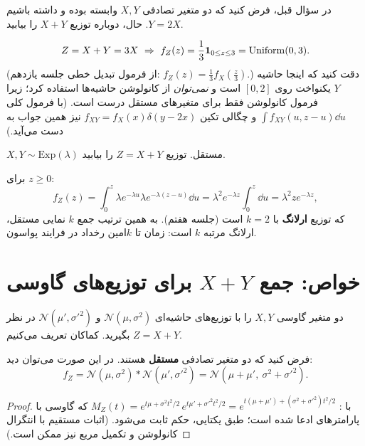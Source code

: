 \begin{example}
در سؤال قبل، فرض کنید که دو متغیر تصادفی $X,Y$ وابسته بوده و داشته باشیم $Y=2X$. حال، دوباره توزیع $X+Y$ را بیابید.
\begin{solution}
\[
Z=X+Y=3X\ \Rightarrow\ f_Z(z)=\frac13\ind_{0\le z\le3}=\mathrm{Uniform}(0,3).
\]
(از فرمول تبدیل خطی جلسه یازدهم: $f_Z(z)=\frac13f_X(\frac z3)$.) دقت کنید که اینجا حاشیه $Y$ یکنواخت روی $[0,2]$ است و \emph{نمی‌توان} از کانولوشن حاشیه‌ها استفاده کرد؛ زیرا فرمول کانولوشن فقط برای متغیرهای مستقل درست است. (با فرمول کلی $\int f_{XY}(u,z-u)\dd u$ و چگالی تکین $f_{XY}=f_X(x)\delta(y-2x)$ نیز همین جواب به دست می‌آید.)
\end{solution}
\end{example}

\begin{example}
$X,Y\sim\mathrm{Exp}(\lambda)$ مستقل. توزیع $Z=X+Y$ را بیابید.
\begin{solution}
برای $z\ge0$:
\[
f_Z(z)=\int_0^z\lambda e^{-\lambda u}\lambda e^{-\lambda(z-u)}\dd u=\lambda^2e^{-\lambda z}\int_0^z\dd u=\lambda^2ze^{-\lambda z},
\]
که توزیع \textbf{ارلانگ} با $k=2$ است (جلسه هفتم). به همین ترتیب جمع $k$ نمایی مستقل، ارلانگ مرتبه $k$ است: زمان تا $k$امین رخداد در فرایند پواسون.
\end{solution}
\end{example}

\section{خواص: جمع $X+Y$ برای توزیع‌های گاوسی}

دو متغیر گاوسی $X,Y$ را با توزیع‌های حاشیه‌ای $\mathcal N(\mu,\sigma^2)$ و $\mathcal N(\mu',\sigma'^2)$ در نظر بگیرید. کماکان تعریف می‌کنیم $Z=X+Y$.

\begin{theorem}
فرض کنید که دو متغیر تصادفی \textbf{مستقل} هستند. در این صورت می‌توان دید:
\[
f_Z=\mathcal N(\mu,\sigma^2)*\mathcal N(\mu',\sigma'^2)=\mathcal N(\mu+\mu',\ \sigma^2+\sigma'^2).
\]
\end{theorem}
\begin{proof}
با : $M_Z(t)=e^{t\mu+\sigma^2t^2/2}\,e^{t\mu'+\sigma'^2t^2/2}=e^{t(\mu+\mu')+(\sigma^2+\sigma'^2)t^2/2}$ که  گاوسی با پارامترهای ادعا شده است؛ طبق یکتایی، حکم ثابت می‌شود. (اثبات مستقیم با انتگرال کانولوشن و تکمیل مربع نیز ممکن است.)
\end{proof}

